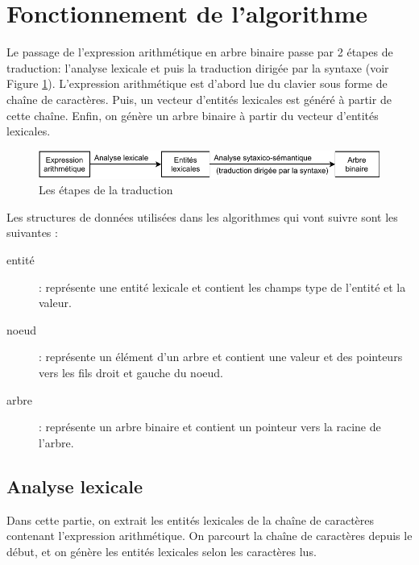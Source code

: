 \section{Fonctionnement de l'algorithme}
Le passage de l'expression arithmétique en arbre binaire passe par 2 étapes de traduction: l'analyse lexicale et puis la traduction dirigée par la syntaxe (voir Figure \ref{fig:etapes_trad}). L'expression arithmétique est d'abord lue du clavier sous forme de chaîne de caractères. Puis, un vecteur d'entités lexicales est généré à partir de cette chaîne. Enfin, on génère un arbre binaire à partir du vecteur d'entités lexicales.

\begin{figure}[H]
    \centering
        \includegraphics[scale=1.0]{./ressources/translation_steps.pdf}
        \caption{Les étapes de la traduction}
    \label{fig:etapes_trad}
\end{figure}
\par
Les structures de données utilisées dans les algorithmes qui vont suivre sont les suivantes :
\begin{description}
    \item[entité] : représente une entité lexicale et contient les champs type de l'entité et la valeur.     
    \item[noeud] : représente un élément d'un arbre et contient une valeur et des pointeurs vers les fils droit et gauche du noeud.
    \item[arbre] : représente un arbre binaire et contient un pointeur vers la racine de l'arbre.
\end{description}

\subsection{Analyse lexicale}
Dans cette partie, on extrait les entités lexicales de la chaîne de caractères contenant l'expression arithmétique.
On parcourt la chaîne de caractères depuis le début, et on génère les entités lexicales selon les caractères lus.

